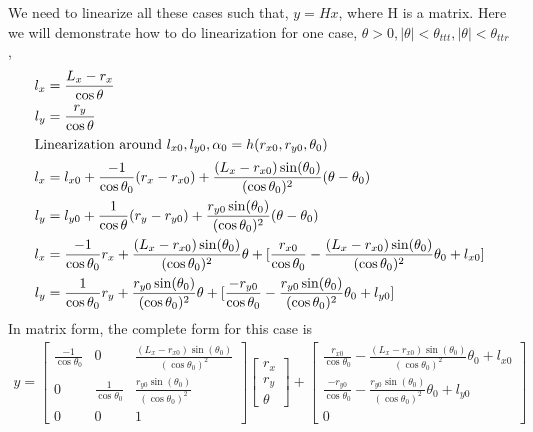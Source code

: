 \documentclass[12pt, letterpaper]{amsart} %
\numberwithin{equation}{section}
\begin{document}
\\
\\
We need to linearize all these cases such that, $y = H x$, where H is a matrix. Here we will demonstrate how to do linearization for one case, $\theta >0, |\theta| < \theta_{ttt}, |\theta| < \theta_{ttr}$,
\begin{align*}
  l_x &= \frac{L_x - r_x}{\cos \theta} \\
  l_y &= \frac{r_y}{\cos \theta} \\
  \intertext{Linearization around $l_{x0}, l_{y0}, \alpha_{0} = h(r_{x0}, r_{y0}, \theta_0)$}
  l_x &= l_{x0} + \frac{-1}{\cos \theta_0} (r_x - r_{x0}) + \frac{(L_x - r_{x0})\sin(\theta_0)}{(\cos{\theta_0})^2} (\theta - \theta_0) \\
  l_y &= l_{y0} + \frac{1}{\cos \theta}(r_y - r_{y0}) + \frac{r_{y0} \sin(\theta_0)}{(\cos \theta_0)^2} (\theta - \theta_0) \\
  l_x &= \frac{-1}{\cos \theta_0} r_x + \frac{(L_x - r_{x0})\sin(\theta_0)}{(\cos{\theta_0})^2} \theta + [\frac{r_{x0}}{\cos \theta_0} - \frac{(L_x - r_{x0})\sin(\theta_0)}{(\cos{\theta_0})^2}\theta_0 + l_{x0}] \\
  l_y &= \frac{1}{\cos \theta_0}r_y + \frac{r_{y0} \sin(\theta_0)}{(\cos \theta_0)^2} \theta + [\frac{-r_{y0}}{\cos \theta_0} - \frac{r_{y0} \sin(\theta_0)}{(\cos \theta_0)^2} \theta_0 + l_{y0}]
\end{align*}
In matrix form, the complete form for this case is
\begin{align*}
  y =
  \begin{bmatrix}
    \frac{-1}{\cos \theta_0} & 0 & \frac{(L_x - r_{x0})\sin(\theta_0)}{(\cos{\theta_0})^2} \\
    0 & \frac{1}{\cos \theta_0} & \frac{r_{y0} \sin(\theta_0)}{(\cos \theta_0)^2} \\
    0 & 0 & 1
  \end{bmatrix}
            \begin{bmatrix}
              r_x \\
              r_y \\
              \theta
            \end{bmatrix}
            +
            \begin{bmatrix}
              \frac{r_{x0}}{\cos \theta_0} - \frac{(L_x - r_{x0})\sin(\theta_0)}{(\cos{\theta_0})^2}\theta_0 + l_{x0} \\
              \frac{-r_{y0}}{\cos \theta_0} - \frac{r_{y0} \sin(\theta_0)}{(\cos \theta_0)^2} \theta_0 + l_{y0} \\
              0
            \end{bmatrix}
\end{align*}
\end{document}
